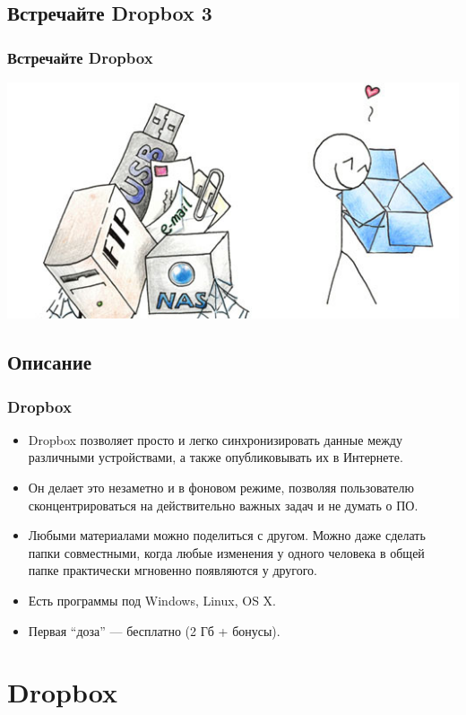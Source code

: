 \documentclass[compress,red]{beamer}
\begin{document}
\subsection{Встречайте Dropbox 3}
\begin{frame}[fragile]
  \frametitle{Встречайте Dropbox}
  \centerline{\includegraphics[width=1.0\textwidth]{images/ilovedropbox2.jpg}}
\end{frame}

\subsection{Описание}
\begin{frame}[fragile]
  \frametitle{Dropbox}
  \begin{itemize}
    \item Dropbox позволяет просто и легко синхронизировать данные между различными устройствами, а также опубликовывать их в Интернете.
    \item Он делает это незаметно и в фоновом режиме, позволяя пользователю сконцентрироваться на действительно важных задач и не думать о ПО.
    \item Любыми материалами можно поделиться с другом. Можно даже сделать папки совместными, когда любые изменения у одного человека в общей папке практически мгновенно появляются у другого.
    \item Есть программы под Windows, Linux, OS X.
    \item Первая ``доза'' --- бесплатно (2 Гб + бонусы).
  \end{itemize}
\end{frame}

\section{Dropbox}
\end{document}
